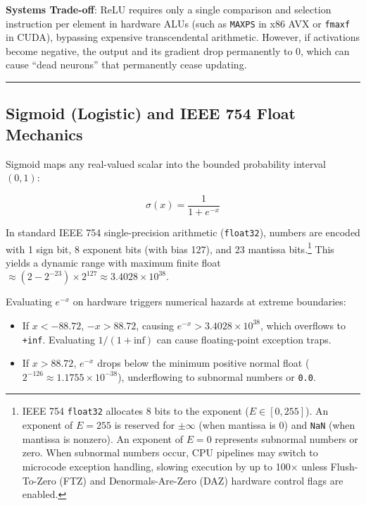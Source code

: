 \documentclass[
  letterpaper,
]{scrbook}
\providecommand{\tightlist}{%
  \setlength{\itemsep}{0pt}\setlength{\parskip}{0pt}}
\begin{document}
\textbf{Systems Trade-off}: ReLU requires only a single comparison and
selection instruction per element in hardware ALUs (such as
\texttt{MAXPS} in x86 AVX or \texttt{fmaxf} in CUDA), bypassing
expensive transcendental arithmetic. However, if activations become
negative, the output and its gradient drop permanently to 0, which can
cause ``dead neurons'' that permanently cease updating.

\begin{center}\rule{0.5\linewidth}{0.5pt}\end{center}

\subsection{Sigmoid (Logistic) and IEEE 754 Float
Mechanics}\label{sigmoid-logistic-and-ieee-754-float-mechanics}

Sigmoid maps any real-valued scalar into the bounded probability
interval \((0, 1)\):

\[\sigma(x) = \frac{1}{1 + e^{-x}}\]

In standard IEEE 754 single-precision arithmetic (\texttt{float32}),
numbers are encoded with 1 sign bit, 8 exponent bits (with bias 127),
and 23 mantissa bits.\footnote{IEEE 754 \texttt{float32} allocates 8
  bits to the exponent (\(E \in [0, 255]\)). An exponent of \(E=255\) is
  reserved for \(\pm \infty\) (when mantissa is 0) and \texttt{NaN}
  (when mantissa is nonzero). An exponent of \(E=0\) represents
  subnormal numbers or zero. When subnormal numbers occur, CPU pipelines
  may switch to microcode exception handling, slowing execution by up to
  100× unless Flush-To-Zero (FTZ) and Denormals-Are-Zero (DAZ) hardware
  control flags are enabled.} This yields a dynamic range with maximum
finite float
\(\approx (2 - 2^{-23}) \times 2^{127} \approx 3.4028 \times 10^{38}\).

Evaluating \(e^{-x}\) on hardware triggers numerical hazards at extreme
boundaries:

\begin{itemize}
\tightlist
\item
  If \(x < -88.72\), \(-x > 88.72\), causing
  \(e^{-x} > 3.4028 \times 10^{38}\), which overflows to \texttt{+inf}.
  Evaluating \(1 / (1 + \text{inf})\) can cause floating-point exception
  traps.
\item
  If \(x > 88.72\), \(e^{-x}\) drops below the minimum positive normal
  float (\(2^{-126} \approx 1.1755 \times 10^{-38}\)), underflowing to
  subnormal numbers or \texttt{0.0}.
\end{itemize}
\end{document}
